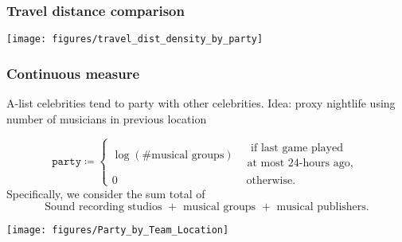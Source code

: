 \documentclass{beamer}
\begin{document}
\begin{frame}   
  \frametitle{Travel distance comparison}
  \centering \texttt{[image: figures/travel\_dist\_density\_by\_party]} 
\end{frame}


\begin{frame}   \frametitle{Continuous measure}
  \begin{block}{A-list celebrities tend to party with other celebrities.}     Idea: proxy nightlife using number of musicians in previous location

    \[
      \texttt{party} \coloneqq \begin{cases}       \log \left(\# \textrm{musical groups}\right) &\substack{\textrm{ if last game played} \\ \textrm{at most 24-hours ago,}} \\
      0 &\textrm{ otherwise.}
    \end{cases}
    \]
    \newline
    Specifically, we consider the sum total of
    \[
      \textrm{Sound recording studios } + \textrm{ musical groups } + \textrm{ musical publishers}.
    \]   \end{block} \end{frame}

\begin{frame}   
  \hspace*{-25pt}
  \texttt{[image: figures/Party\_by\_Team\_Location]} 
\end{frame}
\end{document}
